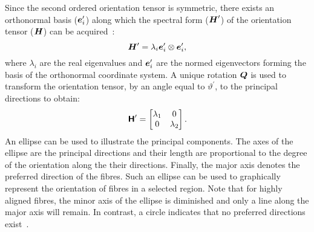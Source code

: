 Since the second ordered orientation tensor is symmetric, there exists an orthonormal basis ($\tena{e}_i^\prime$) along which the spectral form ($\tenb{H}^\prime$) of the orientation tensor ($\tenb{H}$) can be acquired~\autocite{Bertram.2015}:
\begin{equation}
\tenb{H}^\prime=\lambda_i\tena{e}_i^\prime\otimes\tena{e}_i^\prime,
\end{equation}
where $\lambda_i$ are the real eigenvalues and $\tena{e}_i^\prime$ are the normed eigenvectors forming the basis of the orthonormal coordinate system. A unique rotation $\tenb{Q}$ is used to transform the orientation tensor, by an angle equal to $\vartheta^\prime$, to the principal directions to obtain:
\begin{equation}
\mat{H}^\prime=\left[\begin{matrix}
\lambda_1& 0 \\
0 & \lambda_2\\
\end{matrix}
 \right].
\end{equation}
An ellipse can be used to illustrate the principal components. The axes of the ellipse are the principal directions and their length are proportional to the degree of the orientation along the their directions. Finally, the major axis denotes the preferred direction of the fibres. Such an ellipse can be used to graphically represent the orientation of fibres in a selected region. Note that for highly aligned fibres, the minor axis of the ellipse is diminished and only a line along the major axis will remain. In contrast, a circle indicates that no preferred directions exist~\autocite{Advani.1990,Advani.1987}.\\

